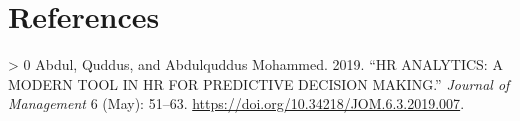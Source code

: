 \documentclass[
]{article}
\newlength{\cslhangindent}
\newenvironment{CSLReferences}[3] %
 {%
  \setlength{\parindent}{0pt}
  \ifodd #1 \everypar{\setlength{\hangindent}{\cslhangindent}}\ignorespaces\fi
  \ifnum #2 > 0
  \setlength{\parskip}{#2\baselineskip}
  \fi
 }%
 {}
\begin{document}
\hypertarget{references}{%
\section*{References}\label{references}}

\hypertarget{refs}{}
\begin{CSLReferences}{1}{0}
\leavevmode\hypertarget{ref-vishal}{}%
Abdul, Quddus, and Abdulquddus Mohammed. 2019. {``HR ANALYTICS: A MODERN
TOOL IN HR FOR PREDICTIVE DECISION MAKING.''} \emph{Journal of
Management} 6 (May): 51--63.
\url{https://doi.org/10.34218/JOM.6.3.2019.007}.

\end{CSLReferences}
\end{document}
